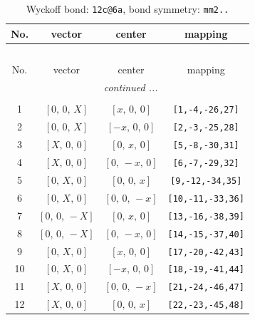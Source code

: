 \documentclass[fleqn,8pt]{jsarticle}
\begin{document}
\begin{longtable}{cccc}
\caption{Wyckoff bond: {\tt 12c@6a}, bond symmetry: {\tt mm2..}}
 \\
 \hline \hline
No. & vector & center & mapping \\ \hline \endfirsthead

\multicolumn{3}{l}{\tablename\ \thetable{}} \\
 \hline \hline
No. & vector & center & mapping \\ \hline \endhead

 \hline \hline
\multicolumn{3}{r}{\footnotesize\it continued ...} \\ \endfoot

 \hline \hline
\multicolumn{3}{r}{} \\ \endlastfoot

1 & $\left[ 0,\, 0,\, X \right]$ & $\left[ x,\, 0,\, 0 \right]$ & {\tt [1,-4,-26,27]} \\ \hline
2 & $\left[ 0,\, 0,\, X \right]$ & $\left[ - x,\, 0,\, 0 \right]$ & {\tt [2,-3,-25,28]} \\ \hline
3 & $\left[ X,\, 0,\, 0 \right]$ & $\left[ 0,\, x,\, 0 \right]$ & {\tt [5,-8,-30,31]} \\ \hline
4 & $\left[ X,\, 0,\, 0 \right]$ & $\left[ 0,\, - x,\, 0 \right]$ & {\tt [6,-7,-29,32]} \\ \hline
5 & $\left[ 0,\, X,\, 0 \right]$ & $\left[ 0,\, 0,\, x \right]$ & {\tt [9,-12,-34,35]} \\ \hline
6 & $\left[ 0,\, X,\, 0 \right]$ & $\left[ 0,\, 0,\, - x \right]$ & {\tt [10,-11,-33,36]} \\ \hline
7 & $\left[ 0,\, 0,\, - X \right]$ & $\left[ 0,\, x,\, 0 \right]$ & {\tt [13,-16,-38,39]} \\ \hline
8 & $\left[ 0,\, 0,\, - X \right]$ & $\left[ 0,\, - x,\, 0 \right]$ & {\tt [14,-15,-37,40]} \\ \hline
9 & $\left[ 0,\, X,\, 0 \right]$ & $\left[ x,\, 0,\, 0 \right]$ & {\tt [17,-20,-42,43]} \\ \hline
10 & $\left[ 0,\, X,\, 0 \right]$ & $\left[ - x,\, 0,\, 0 \right]$ & {\tt [18,-19,-41,44]} \\ \hline
11 & $\left[ X,\, 0,\, 0 \right]$ & $\left[ 0,\, 0,\, - x \right]$ & {\tt [21,-24,-46,47]} \\ \hline
12 & $\left[ X,\, 0,\, 0 \right]$ & $\left[ 0,\, 0,\, x \right]$ & {\tt [22,-23,-45,48]} \\
\end{longtable}
\renewcommand{\arraystretch}{1.2}
\end{document}
